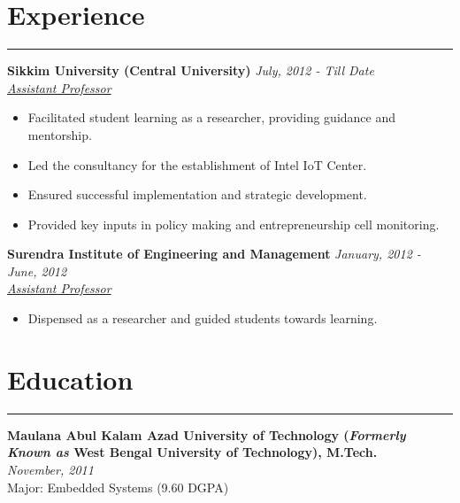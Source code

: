 \documentclass[10pt, a4paper]{article}
\begin{document}
\section*{Experience}
\vspace*{-2.5mm}
\hrule 
\vspace*{2mm}
  \noindent\textbf{Sikkim University (Central University)} \hfill \textit{July, 2012 - Till Date}\\
  \textit{\underline{Assistant Professor}} \\
  \vspace*{-4mm}
    \begin{itemize}[leftmargin=*]
	\item Facilitated student learning as a researcher, providing guidance and mentorship.
	    \vspace*{-2.5mm}
	\item Led the consultancy for the establishment of Intel IoT Center. 
	\vspace*{-2.5mm}
	\item Ensured successful implementation and strategic development.
	    \vspace*{-2.5mm}
	\item Provided key inputs in policy making and entrepreneurship cell monitoring.  
	\end{itemize}

  \noindent\textbf{Surendra Institute of Engineering and Management} \hfill \textit{January, 2012 - June, 2012}\\
  \textit{\underline{Assistant Professor}} \\
\vspace*{-4mm}
\begin{itemize}[leftmargin=*]
	\item Dispensed as a researcher and guided students towards learning.

\end{itemize}


	\vspace*{-5mm}	

    
    \section*{Education}
    \vspace*{-2.5mm}
    \hrule 
    \vspace*{2mm}
    \textbf{Maulana Abul Kalam Azad University of Technology (\textit{Formerly Known as} West Bengal University of Technology), M.Tech.}\\
    \textit{November, 2011}\\
    Major: Embedded Systems (9.60 DGPA)\\
    
\end{document}
